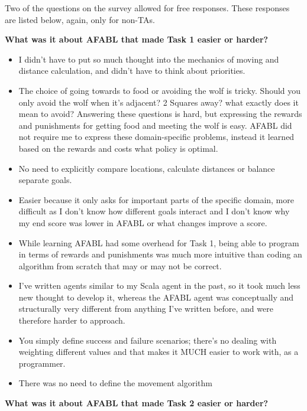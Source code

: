 Two of the questions on the survey allowed for free responses. These responses are listed below, again, only for non-TAs.

{\bf What was it about AFABL that made Task 1 easier or harder?}

\begin{itemize}
\item I didn't have to put so much thought into the mechanics of moving and distance calculation, and didn't have to think about priorities.
\item The choice of going towards to food or avoiding the wolf is tricky. Should you only avoid the wolf when it's adjacent? 2 Squares away? what exactly does it mean to avoid? Answering these questions is hard, but expressing the rewards and punishments for getting food and meeting the wolf is easy. AFABL did not require me to express these domain-specific problems, instead it learned based on the rewards and costs what policy is optimal.
\item No need to explicitly compare locations, calculate distances or balance separate goals.
\item Easier because it only asks for important parts of the specific domain, more difficult as I don't know how different goals interact and I don't know why my end score was lower in AFABL or what changes improve a score.
\item While learning AFABL had some overhead for Task 1, being able to program in terms of rewards and punishments was much more intuitive than coding an algorithm from scratch that may or may not be correct.
\item I've written agents similar to my Scala agent in the past, so it took much less new thought to develop it, whereas the AFABL agent was conceptually and structurally very different from anything I've written before, and were therefore harder to approach.
\item You simply define success and failure scenarios; there's no dealing with weighting different values and that makes it MUCH easier to work with, as a programmer.
\item There was no need to define the movement algorithm
\end{itemize}

{\bf What was it about AFABL that made Task 2 easier or harder?}

